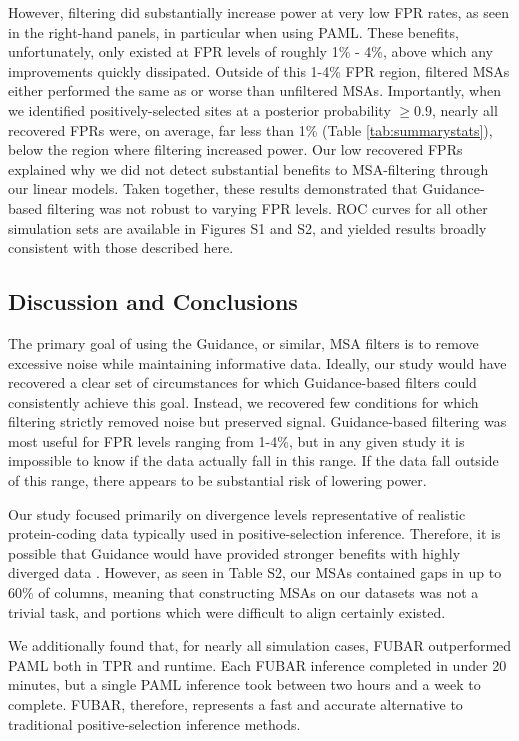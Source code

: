 \documentclass[11pt]{article}
\begin{document}
However, filtering did substantially increase power at very low FPR rates, as seen in the right-hand panels, in particular when using PAML. These benefits, unfortunately, only existed at FPR levels of roughly 1\% - 4\%, above which any improvements quickly dissipated. Outside of this 1-4\% FPR region, filtered MSAs either performed the same as or worse than unfiltered MSAs. Importantly, when we identified positively-selected sites at a posterior probability $\geq 0.9$, nearly all recovered FPRs were, on average, far less than 1\% (Table \ref{tab:summarystats}), below the region where filtering increased power. Our low recovered FPRs explained why we did not detect substantial benefits to MSA-filtering through our linear models. Taken together, these results demonstrated that Guidance-based filtering was not robust to varying FPR levels. ROC curves for all other simulation sets are available in Figures S1 and S2, and yielded results broadly consistent with those described here.

\subsection*{Discussion and Conclusions}

The primary goal of using the Guidance, or similar, MSA filters is to remove excessive noise while maintaining informative data. Ideally, our study would have recovered a clear set of circumstances for which Guidance-based filters could consistently achieve this goal. Instead, we recovered few conditions for which filtering strictly removed noise but preserved signal. Guidance-based filtering was most useful for FPR levels ranging from 1-4\%, but in any given study it is impossible to know if the data actually fall in this range. If the data fall outside of this range, there appears to be substantial risk of lowering power.

Our study focused primarily on divergence levels representative of realistic protein-coding data typically used in positive-selection inference. Therefore, it is possible that Guidance would have provided stronger benefits with highly diverged data \citep{Privman2012}. However, as seen in Table S2, our MSAs contained gaps in up to 60\% of columns, meaning that constructing MSAs on our datasets was not a trivial task, and portions which were difficult to align certainly existed.

We additionally found that, for nearly all simulation cases, FUBAR outperformed PAML both in TPR and runtime. Each FUBAR inference completed in under 20 minutes, but a single PAML inference took between two hours and a week to complete. FUBAR, therefore, represents a fast and accurate alternative to traditional positive-selection inference methods.
\end{document}
